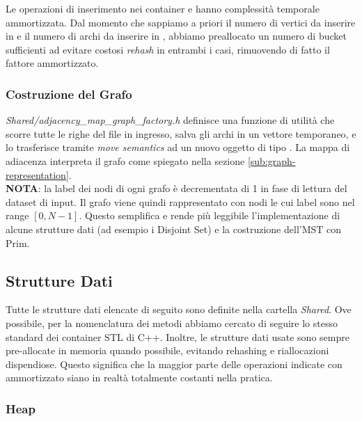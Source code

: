 \noindent Le operazioni di inserimento nei container  e  hanno complessità temporale \complexityConstant{} ammortizzata. Dal momento che sappiamo a priori il numero di vertici da inserire in  e il numero di archi da inserire in , abbiamo preallocato un numero di bucket sufficienti ad evitare costosi \textit{rehash} in entrambi i casi, rimuovendo di fatto il fattore ammortizzato.

\subsubsection {Costruzione del Grafo}

\textit{Shared/adjacency\_map\_graph\_factory.h} definisce una funzione di utilità che scorre tutte le righe del file in ingresso, salva gli archi in un vettore temporaneo, e lo trasferisce tramite \textit{move semantics} ad un nuovo oggetto di tipo . La mappa di adiacenza interpreta il grafo come spiegato nella sezione \ref{sub:graph-representation}. \\

\noindent \textbf{NOTA}: la label dei nodi di ogni grafo è decrementata di 1 in fase di lettura del dataset di input. Il grafo viene quindi rappresentato con nodi le cui label sono nel range $[0, N-1]$.
Questo semplifica e rende più leggibile l'implementazione di alcune strutture dati (ad esempio i Disjoint Set) e la costruzione dell'MST con Prim.

\subsection{Strutture Dati}

Tutte le strutture dati elencate di seguito sono definite nella cartella \textit{Shared}.
Ove possibile, per la nomenclatura dei metodi abbiamo cercato di seguire lo stesso standard dei container STL di C++.
Inoltre, le strutture dati usate sono sempre pre-allocate in memoria quando possibile, evitando rehashing e riallocazioni dispendiose. Questo significa che la maggior parte delle operazioni indicate con \complexityConstant{} ammortizzato siano in realtà totalmente costanti nella pratica.

\subsubsection{Heap}

